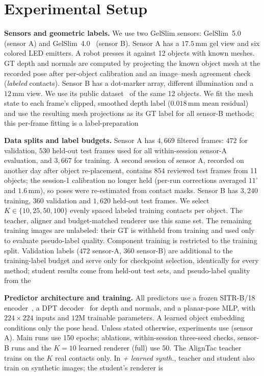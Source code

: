 \section{Experimental Setup}
\label{sec:setup}

\noindent\textbf{Sensors and geometric labels.} We use two GelSlim sensors: GelSlim~5.0~\cite{wang2026gelslim} (sensor A) and GelSlim~4.0~\cite{sipos2024gelslim4} (sensor B). Sensor A has a $17.5\,$mm gel view and six colored LED emitters. A robot presses it against 12 objects with known meshes. GT depth and normals are computed by projecting the known object mesh at the recorded pose after per-object calibration and an image--mesh agreement check (\emph{labeled} contacts). Sensor B has a dot-marker array, different illumination and a $12\,$mm view. We use its public dataset~\cite{sipos2024gelslim4} of the same 12 objects. We fit the mesh state to each frame's clipped, smoothed depth label ($0.018\,$mm mean residual) and use the resulting mesh projections as its GT label for all sensor-B methods; this per-frame fitting is a label-preparation 

\noindent\textbf{Data splits and label budgets.} Sensor A has $4{,}669$ filtered frames: $472$ for validation, $530$ held-out test frames used for all within-session sensor-A evaluation, and $3{,}667$ for training. A second session of sensor A, recorded on another day after object re-placement, contains $854$ reviewed test frames from 11 objects; the session-1 calibration no longer held (per-run corrections averaged $11^\circ$ and $1.6\,$mm), so poses were re-estimated from contact masks. Sensor B has $3{,}240$ training, $360$ validation and $1{,}620$ held-out test frames. We select $K\in\{10,25,50,100\}$ evenly spaced labeled training contacts per object. The teacher, aligner and budget-matched renderer use this same set. The remaining training images are unlabeled: their GT is withheld from training and used only to evaluate pseudo-label quality. Component training is restricted to the training split. Validation labels ($472$ sensor-A, $360$ sensor-B) are additional to the training-label budget and serve only for checkpoint selection, identically for every method; student results come from held-out test sets, and pseudo-label quality from the 

\noindent\textbf{Predictor architecture and training.} All predictors use a frozen SITR-B/18 encoder~\cite{gupta2025sitr}, a DPT decoder~\cite{ranftl2021dpt} for depth and normals, and a planar-pose MLP, with $224\times224$ inputs and $12$M trainable parameters. A learned object embedding conditions only the pose head. Unless stated otherwise, experiments use \sensor{} (sensor A). Main runs use 150 epochs; ablations, within-session three-seed checks, sensor-B runs and the $K=10$ learned renderer (full) use 50. The AlignTac teacher trains on the $K$ real contacts only. In \emph{+ learned synth.}, teacher and student also train on synthetic images; the student's renderer is 

